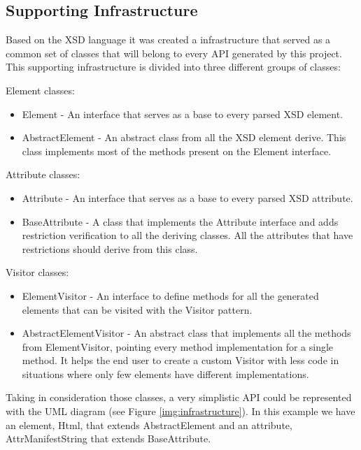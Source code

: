 \subsection{Supporting Infrastructure}
\label{sec:supportinginfrastructure}

Based on the \ac{XSD} language it was created a infrastructure that served as a common set of classes that will belong to every \ac{API} generated by this project. This supporting infrastructure is divided into three different groups of classes:

Element classes:

\begin{itemize}  
	\item Element - An interface that serves as a base to every parsed \ac{XSD} element.
	\item AbstractElement - An abstract class from all the \ac{XSD} element derive. This class implements most of the methods present on the Element interface.
\end{itemize}

Attribute classes:

\begin{itemize}  
	\item Attribute - An interface that serves as a base to every parsed \ac{XSD} attribute.
	\item BaseAttribute - A class that implements the Attribute interface and adds restriction verification to all the deriving classes. All the attributes that have restrictions should derive from this class.
\end{itemize}

Visitor classes:

\begin{itemize}
	\item ElementVisitor - An interface to define methods for all the generated elements that can be visited with the Visitor pattern.
	\item AbstractElementVisitor - An abstract class that implements all the methods from ElementVisitor, pointing every method implementation for a single method. It helps the end user to create a custom Visitor with less code in situations where only few elements have different implementations.
\end{itemize}

\noindent
Taking in consideration those classes, a very simplistic \ac{API} could be represented with the \ac{UML} diagram (see Figure \ref{img:infrastructure}). In this example we have an element, Html, that extends AbstractElement and an attribute, AttrManifestString that extends BaseAttribute. 

